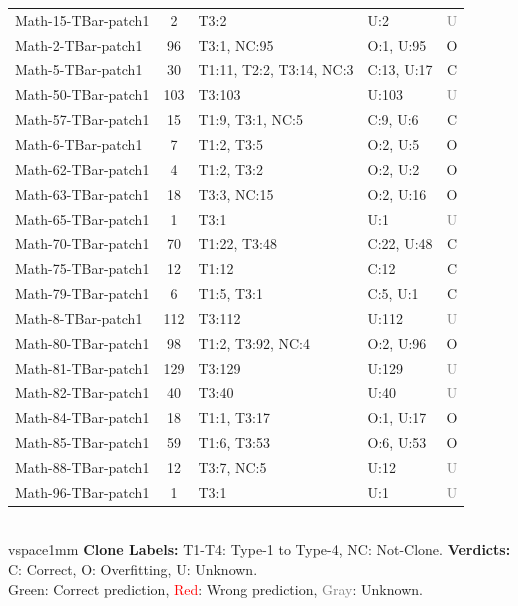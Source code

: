 \begin{table}[t]
\begin{tabular}{l|c|l|l|c}
Math-15-TBar-patch1 & 2 & T3:2 & U:2 & \textcolor{gray}{U} \\
Math-2-TBar-patch1 & 96 & T3:1, NC:95 & O:1, U:95 & \textcolor{green!60!black}{O} \\
Math-5-TBar-patch1 & 30 & T1:11, T2:2, T3:14, NC:3 & C:13, U:17 & \textcolor{green!60!black}{C} \\
Math-50-TBar-patch1 & 103 & T3:103 & U:103 & \textcolor{gray}{U} \\
Math-57-TBar-patch1 & 15 & T1:9, T3:1, NC:5 & C:9, U:6 & \textcolor{green!60!black}{C} \\
Math-6-TBar-patch1 & 7 & T1:2, T3:5 & O:2, U:5 & \textcolor{green!60!black}{O} \\
Math-62-TBar-patch1 & 4 & T1:2, T3:2 & O:2, U:2 & \textcolor{green!60!black}{O} \\
Math-63-TBar-patch1 & 18 & T3:3, NC:15 & O:2, U:16 & \textcolor{green!60!black}{O} \\
Math-65-TBar-patch1 & 1 & T3:1 & U:1 & \textcolor{gray}{U} \\
Math-70-TBar-patch1 & 70 & T1:22, T3:48 & C:22, U:48 & \textcolor{green!60!black}{C} \\
Math-75-TBar-patch1 & 12 & T1:12 & C:12 & \textcolor{green!60!black}{C} \\
Math-79-TBar-patch1 & 6 & T1:5, T3:1 & C:5, U:1 & \textcolor{green!60!black}{C} \\
Math-8-TBar-patch1 & 112 & T3:112 & U:112 & \textcolor{gray}{U} \\
Math-80-TBar-patch1 & 98 & T1:2, T3:92, NC:4 & O:2, U:96 & \textcolor{green!60!black}{O} \\
Math-81-TBar-patch1 & 129 & T3:129 & U:129 & \textcolor{gray}{U} \\
Math-82-TBar-patch1 & 40 & T3:40 & U:40 & \textcolor{gray}{U} \\
Math-84-TBar-patch1 & 18 & T1:1, T3:17 & O:1, U:17 & \textcolor{green!60!black}{O} \\
Math-85-TBar-patch1 & 59 & T1:6, T3:53 & O:6, U:53 & \textcolor{green!60!black}{O} \\
Math-88-TBar-patch1 & 12 & T3:7, NC:5 & U:12 & \textcolor{gray}{U} \\
Math-96-TBar-patch1 & 1 & T3:1 & U:1 & \textcolor{gray}{U} \\
\hline
\end{tabular}
\vspace{1mm}
\parbox{\linewidth}{\centering\footnotesize 
\\vspace{{1mm}}
\textbf{Clone Labels:} T1-T4: Type-1 to Type-4, NC: Not-Clone. \;
\textbf{Verdicts:} C: Correct, O: Overfitting, U: Unknown. \\
\textcolor{green!60!black}{Green}: Correct prediction, \textcolor{red}{Red}: Wrong prediction, \textcolor{gray}{Gray}: Unknown.}
\end{table}
